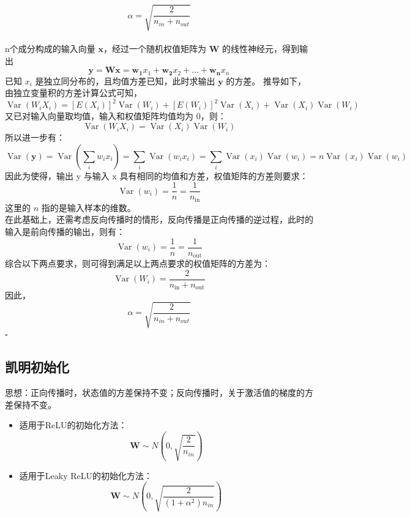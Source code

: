 \documentclass[UTF-8]{progbookcn}
\newenvironment{proof}{{\noindent\textbf{证明:}}}{\hfill $\square$\par}
\begin{document}
\begin{proof} $$\alpha = \sqrt{\frac{2}{n_{in}+n_{out}}}$$\\
\indent n个成分构成的输入向量 $\bm{x}$，经过一个随机权值矩阵为 $\bm{W}$ 的线性神经元，得到输出
$$\bm{y}=\bm{W} \bm{x}=\bm{w_{1}} x_{1}+\bm{w_{2}} x_{2}+\ldots+\bm{w_{n}} x_{n}$$
\indent 已知 $x_i$ 是独立同分布的，且均值方差已知，此时求输出 $\bm{y}$ 的方差。
推导如下，由独立变量积的方差计算公式可知，
$$\operatorname{Var}\left(W_{i} X_{i}\right)=\left[E\left(X_{i}\right)\right]^{2} \operatorname{Var}\left(W_{i}\right)+\left[E\left(W_{i}\right)\right]^{2} \operatorname{Var}\left(X_{i}\right)+\operatorname{Var}\left(X_{i}\right) \operatorname{Var}\left(W_{i}\right)$$
又已对输入向量取均值，输入和权值矩阵均值均为 0，则：
$$\operatorname{Var}\left(W_{i} X_{i}\right)=\operatorname{Var}\left(X_{i}\right) \operatorname{Var}\left(W_{i}\right)$$
所以进一步有：
$$\operatorname{Var}(\boldsymbol{y})=\operatorname{Var}\left(\sum_{i} w_{i} x_{i}\right)=\sum_{i} \operatorname{Var}\left(w_{i} x_{i}\right)=\sum_{i} \operatorname{Var}\left(x_{i}\right) \operatorname{Var}\left(w_{i}\right)=n \operatorname{Var}\left(x_{i}\right) \operatorname{Var}\left(w_{i}\right)$$
因此为使得，输出 y 与输入 x 具有相同的均值和方差，权值矩阵的方差则要求：
$$\operatorname{Var}\left(w_{i}\right)=\frac{1}{n}=\frac{1}{n_{\mathrm{in}}}$$
这里的 $n$ 指的是输入样本的维数。\\
\indent 在此基础上，还需考虑反向传播时的情形，反向传播是正向传播的逆过程，此时的输入是前向传播的输出，则有：
$$\operatorname{Var}\left(w_{i}\right)=\frac{1}{n}=\frac{1}{n_{\mathrm{out}}}$$
综合以下两点要求，则可得到满足以上两点要求的权值矩阵的方差为：
$$\operatorname{Var}\left(W_{i}\right)=\frac{2}{n_{\mathrm{in}}+n_{\mathrm{out}}}$$
因此，$$\alpha = \sqrt{\frac{2}{n_{in}+n_{out}}}$$
\end{proof}






\subsection{凯明初始化}
\begin{keypoint}
思想：正向传播时，状态值的方差保持不变；反向传播时，关于激活值的梯度的方差保持不变\cite{DBLP:conf/cvpr/HeZRS16}。
\end{keypoint}

\begin{itemize}
  \item 适用于ReLU的初始化方法：\\
  \begin{equation}\label{Eq:Kai}
    \bm{W} \sim N(0, \sqrt{\frac{2}{n_{in}}})
  \end{equation}
  \item 适用于Leaky ReLU的初始化方法：\\
  \begin{equation}%
     \bm{W} \sim N(0, \sqrt{\frac{2}{(1+\alpha^2)n_{in}}})
  \end{equation}
\end{itemize}
\end{document}
